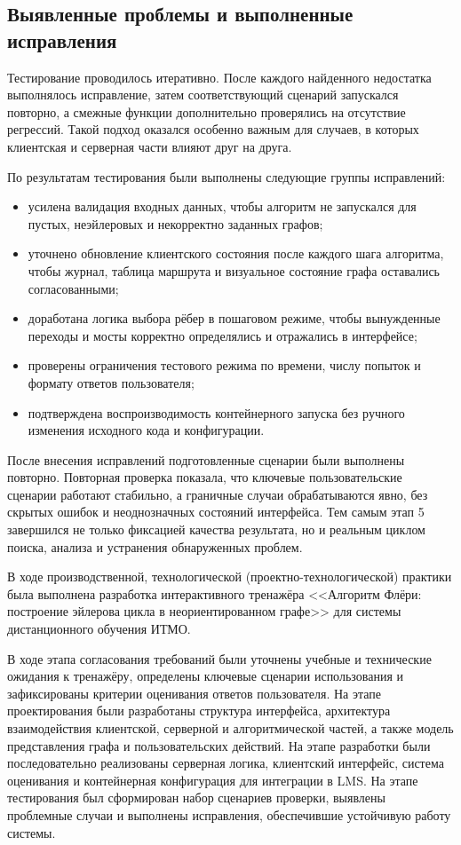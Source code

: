 \documentclass[a4paper,12pt]{extarticle}
\begin{document}
\subsection{Выявленные проблемы и выполненные исправления}

Тестирование проводилось итеративно. После каждого найденного недостатка выполнялось исправление, затем соответствующий сценарий запускался повторно, а смежные функции дополнительно проверялись на отсутствие регрессий. Такой подход оказался особенно важным для случаев, в которых клиентская и серверная части влияют друг на друга.

По результатам тестирования были выполнены следующие группы исправлений:
\begin{itemize}
  \item усилена валидация входных данных, чтобы алгоритм не запускался для пустых, неэйлеровых и некорректно заданных графов;
  \item уточнено обновление клиентского состояния после каждого шага алгоритма, чтобы журнал, таблица маршрута и визуальное состояние графа оставались согласованными;
  \item доработана логика выбора рёбер в пошаговом режиме, чтобы вынужденные переходы и мосты корректно определялись и отражались в интерфейсе;
  \item проверены ограничения тестового режима по времени, числу попыток и формату ответов пользователя;
  \item подтверждена воспроизводимость контейнерного запуска без ручного изменения исходного кода и конфигурации.
\end{itemize}

После внесения исправлений подготовленные сценарии были выполнены повторно. Повторная проверка показала, что ключевые пользовательские сценарии работают стабильно, а граничные случаи обрабатываются явно, без скрытых ошибок и неоднозначных состояний интерфейса. Тем самым этап 5 завершился не только фиксацией качества результата, но и реальным циклом поиска, анализа и устранения обнаруженных проблем.


В ходе производственной, технологической (проектно-технологической) практики была выполнена разработка интерактивного тренажёра <<Алгоритм Флёри: построение эйлерова цикла в неориентированном графе>> для системы дистанционного обучения ИТМО.

В ходе этапа согласования требований были уточнены учебные и технические ожидания к тренажёру, определены ключевые сценарии использования и зафиксированы критерии оценивания ответов пользователя. На этапе проектирования были разработаны структура интерфейса, архитектура взаимодействия клиентской, серверной и алгоритмической частей, а также модель представления графа и пользовательских действий. На этапе разработки были последовательно реализованы серверная логика, клиентский интерфейс, система оценивания и контейнерная конфигурация для интеграции в LMS. На этапе тестирования был сформирован набор сценариев проверки, выявлены проблемные случаи и выполнены исправления, обеспечившие устойчивую работу системы.
\end{document}
